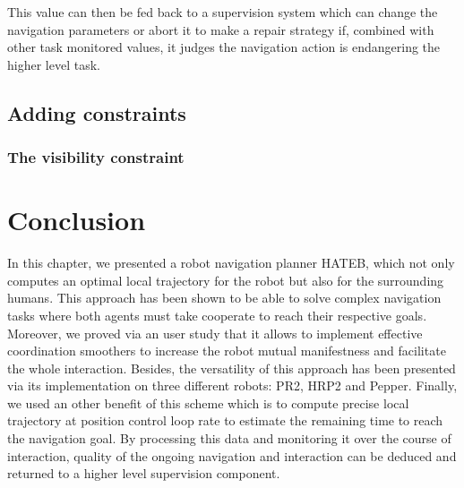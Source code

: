 \documentclass[a4paper,11pt,twoside]{StyleThese}
\begin{document}
This value can then be fed back to a supervision system which can change the navigation parameters or abort it to make a repair strategy if, combined with other task monitored values, it judges the navigation action is endangering the higher level task.





\subsection{Adding constraints}


\subsubsection{The visibility constraint}
\label{sect:chapter2_visibility_constraint}



\section{Conclusion}

In this chapter, we presented a robot navigation planner HATEB, which not only computes an optimal local trajectory for the robot but also for the surrounding humans. This approach has been shown to be able to solve complex navigation tasks where both agents must take cooperate to reach their respective goals. Moreover, we proved via an user study that it allows to implement effective coordination smoothers to increase the robot mutual manifestness and facilitate the whole interaction.
Besides, the versatility of this approach has been presented via its implementation on three different robots: PR2, HRP2 and Pepper.
Finally, we used an other benefit of this scheme which is to compute precise local trajectory at position control loop rate to estimate the remaining time to reach the navigation goal. By processing this data and monitoring it over the course of interaction, quality of the ongoing navigation and interaction can be deduced and returned to a higher level supervision component.
\end{document}
